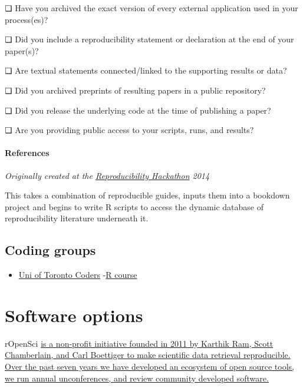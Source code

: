 \documentclass[
]{book}
\providecommand{\tightlist}{%
  \setlength{\itemsep}{0pt}\setlength{\parskip}{0pt}}
\begin{document}
❏ Have you archived the exact version of every external application used in your process(es)?

❏ Did you include a reproducibility statement or declaration at the end of your paper(s)?

❏ Are textual statements connected/linked to the supporting results or data?

❏ Did you archived preprints of resulting papers in a public repository?

❏ Did you release the underlying code at the time of publishing a paper?

❏ Are you providing public access to your scripts, runs, and results?

\hypertarget{references}{%
\subsubsection{References}\label{references}}

\emph{Originally created at the \href{https://github.com/Reproducible-Science-Curriculum/Reproducible-Science-Hackathon-Dec-08-2014}{Reproducibility Hackathon} 2014}

This takes a combination of reproducible guides, inputs them into a bookdown project and begins to write R scripts to access the dynamic database of reproducibility literature underneath it.

\hypertarget{coding-groups}{%
\section{Coding groups}\label{coding-groups}}

\begin{itemize}
\tightlist
\item
  \href{https://github.com/UofTCoders}{Uni of Toronto Coders}
  -\href{https://github.com/UofTCoders/rcourse}{R course}
\end{itemize}

\hypertarget{software-options}{%
\chapter{Software options}\label{software-options}}

rOpenSci \href{https://ropensci.org/about/}{is a non-profit initiative founded in 2011 by Karthik Ram, Scott Chamberlain, and Carl Boettiger to make scientific data retrieval reproducible. Over the past seven years we have developed an ecosystem of open source tools, we run annual unconferences, and review community developed software.}
\end{document}
